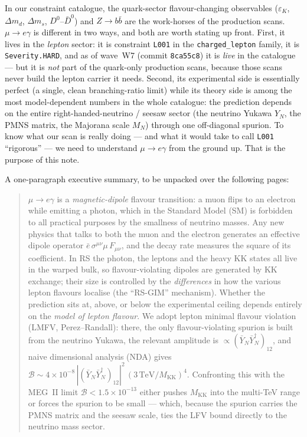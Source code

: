 \documentclass[11pt]{article}
\newcommand{\MKK}{M_{\mathrm{KK}}}
\newcommand{\eps}{\varepsilon}
\newcommand{\YN}{Y_N}
\newcommand{\YNb}{\bar Y_N}
\newcommand{\spur}{(\YNb\YNb^\dagger)_{12}}
\newcommand{\BR}{\mathcal{B}}
\newcommand{\code}[1]{\texttt{#1}}
\theoremstyle{definition}
\begin{document}
In our constraint catalogue, the quark-sector flavour-changing observables
($\eps_K$, $\Delta m_d$, $\Delta m_s$, $D^0$--$\bar D^0$) and $Z\to b\bar b$ are
the work-horses of the production scans. $\mu\to e\gamma$ is different in two
ways, and both are worth stating up front. First, it lives in the
\emph{lepton} sector: it is constraint \code{L001} in the \code{charged\_lepton}
family, it is \code{Severity.HARD}, and as of wave~W7 (commit \code{8ca55c8}) it
is \emph{live} in the catalogue --- but it is \emph{not} part of the quark-only
production scans, because those scans never build the lepton carrier it needs.
Second, its experimental side is essentially perfect (a single, clean
branching-ratio limit) while its theory side is among the most model-dependent
numbers in the whole catalogue: the prediction depends on the entire
right-handed-neutrino / seesaw sector (the neutrino Yukawa $\YN$, the PMNS
matrix, the Majorana scale $M_N$) through one off-diagonal spurion. To know what
our scan is really doing --- and what it would take to call \code{L001}
``rigorous'' --- we need to understand $\mu\to e\gamma$ from the ground up. That
is the purpose of this note.

A one-paragraph executive summary, to be unpacked over the following pages:

\begin{quote}
\small
$\mu\to e\gamma$ is a \emph{magnetic-dipole} flavour transition: a muon flips to
an electron while emitting a photon, which in the Standard Model (SM) is
forbidden to all practical purposes by the smallness of neutrino masses. Any new
physics that talks to both the muon and the electron generates an effective
dipole operator $\bar e\,\sigma^{\mu\nu}\mu\,F_{\mu\nu}$, and the decay rate
measures the square of its coefficient. In RS the photon, the leptons and the
heavy KK states all live in the warped bulk, so flavour-violating dipoles are
generated by KK exchange; their size is controlled by the \emph{differences} in
how the various lepton flavours localise (the ``RS-GIM'' mechanism). Whether the
prediction sits at, above, or below the experimental ceiling depends entirely on
the \emph{model of lepton flavour}. We adopt lepton minimal flavour violation
(LMFV, Perez--Randall): there, the only flavour-violating spurion is built from
the neutrino Yukawa, the relevant amplitude is $\propto\spur$, and naive
dimensional analysis (NDA) gives $\BR\sim 4\times10^{-8}\,|\spur|^2\,(3\,
\mathrm{TeV}/\MKK)^4$. Confronting this with the MEG~II limit
$\BR<1.5\times10^{-13}$ either pushes $\MKK$ into the multi-TeV range or forces
the spurion to be small --- which, because the spurion carries the PMNS matrix
and the seesaw scale, ties the LFV bound directly to the neutrino mass sector.
\end{quote}
\end{document}
